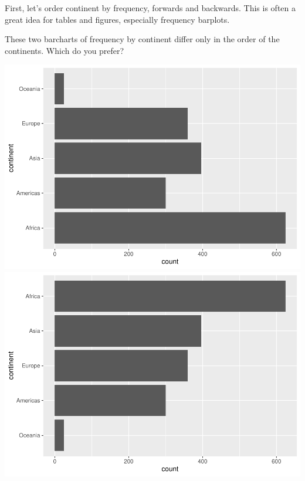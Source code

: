 \documentclass[
]{book}
\newenvironment{Shaded}{\begin{snugshade}}{\end{snugshade}}
\newcommand{\CommentTok}[1]{\textcolor[rgb]{0.56,0.35,0.01}{\textit{#1}}}
\newcommand{\KeywordTok}[1]{\textcolor[rgb]{0.13,0.29,0.53}{\textbf{#1}}}
\newcommand{\NormalTok}[1]{#1}
\newcommand{\OperatorTok}[1]{\textcolor[rgb]{0.81,0.36,0.00}{\textbf{#1}}}
\newcommand{\StringTok}[1]{\textcolor[rgb]{0.31,0.60,0.02}{#1}}
\begin{document}
First, let's order continent by frequency, forwards and backwards. This is often a great idea for tables and figures, especially frequency barplots.

\begin{Shaded}
\end{Shaded}

These two barcharts of frequency by continent differ only in the order of the continents. Which do you prefer?

\includegraphics[width=0.49\linewidth]{10_factors_files/figure-latex/unnamed-chunk-9-1} \includegraphics[width=0.49\linewidth]{10_factors_files/figure-latex/unnamed-chunk-9-2}
\end{document}
